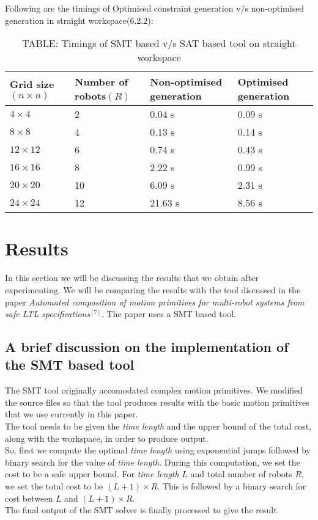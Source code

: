 \documentclass{article}[11pt]
\begin{document}
			Following are the timings of Optimised constraint generation v/s non-optimised generation in straight workspace($6.2.2$):
				\begin{table}[h!]
				\centering
				\begin{tabular}{|| p{2cm} | p{2cm} | p{2cm} | p{2cm} ||} 
				 \hline\hline
				 Grid size$(n \times n)$ & Number of robots$(R)$ & Non-optimised generation & Optimised generation \\ [0.5ex] 
				 \hline\hline
				 $4 \times 4$ & 2 & 0.04 s & 0.09 s\\ 
				 $8 \times 8$ & 4 & 0.13 s & 0.14 s\\
				 $12 \times 12$ & 6 & 0.74 s & 0.43 s\\
				 $16 \times 16$ & 8 & 2.22 s & 0.99 s\\
				 $20 \times 20$ & 10 & 6.09 s & 2.31 s\\
				 $24 \times 24$ & 12 & 21.63 s & 8.56 s\\ [1ex]
				 \hline
				\end{tabular}
				\caption*{TABLE: Timings of SMT based v/s SAT based tool on straight workspace}
				\end{table}


	\section{Results}
		In this section we will be discussing the results that we obtain after experimenting. We will be comparing the results with the tool discussed in the paper \textit{Automated composition of motion primitives for multi-robot systems from safe LTL specifications}$^{[7]}$. The paper uses a SMT based tool.
		\subsection{A brief discussion on the implementation of the SMT based tool}
		The SMT tool originally accomodated complex motion primitives. We modified the source files so that the tool produces results with the basic motion primitives that we use currently in this paper.\\
		The tool needs to be given the \textit{time length} and the upper bound of the total cost, along with the workspace, in order to produce output.\\
		So, first we compute the optimal \textit{time length} using exponential jumps followed by binary search for the value of \textit{time length}. During this computation, we set the cost to be a safe upper bound. For \textit{time length} $L$ and total number of robots $R$, we set the total cost to be $(L+1) \times R$. This is followed by a binary search for cost between $L$ and $(L+1) \times R$.\\
		The final output of the SMT solver is finally processed to give the result.
\end{document}
